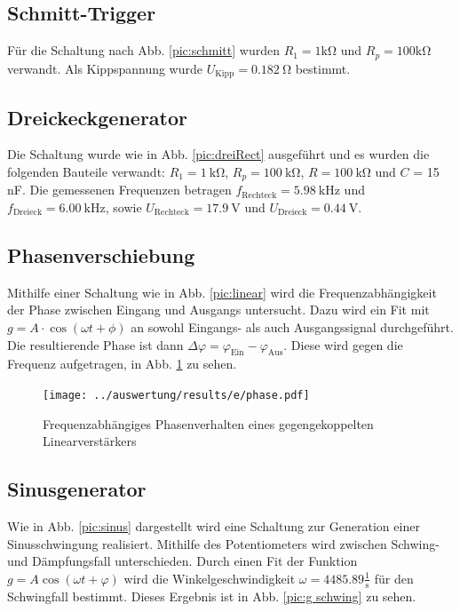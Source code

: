 \subsection{Schmitt-Trigger}
Für die Schaltung nach Abb. \ref{pic:schmitt} wurden $R_1 = 1 \si{\kilo\ohm}$ und $R_p = 100 \si{\kilo\ohm}$ verwandt. Als Kippspannung wurde $U_\text{Kipp} = 0.182\ \si{\ohm}$ bestimmt.

\subsection{Dreickeckgenerator}
Die Schaltung wurde wie in Abb. \ref{pic:dreiRect} ausgeführt und es wurden die folgenden Bauteile verwandt: $R_1 = 1\ \si{\kilo\ohm}$, $R_p = 100\ \si{\kilo\ohm}$, $R = 100\ \si{\kilo\ohm}$ und $C$ = 15 nF. Die gemessenen Frequenzen betragen $f_\text{Rechteck} = 5.98\ \si{\kilo\hertz}$ und $f_\text{Dreieck} = 6.00\ \si{\kilo\hertz}$, sowie $U_\text{Rechteck} = 17.9\ \si{\volt}$ und $U_\text{Dreieck} = 0.44\ \si{\volt}$.

\subsection{Phasenverschiebung}
Mithilfe einer Schaltung wie in Abb. \ref{pic:linear} wird die Frequenzabhängigkeit der Phase zwischen Eingang und Ausgangs untersucht. Dazu wird ein Fit mit $g = A \cdot \cos (\omega t + \phi)$ an sowohl Eingangs- als auch Ausgangssignal durchgeführt. Die resultierende Phase ist dann $\Delta \varphi = \varphi_\text{Ein} - \varphi_\text{Aus}$. Diese wird gegen die Frequenz aufgetragen, in Abb. \ref{pic:e phase} zu sehen.

\begin{figure}
	\centering
	\texttt{[image: ../auswertung/results/e/phase.pdf]}
	\caption{Frequenzabhängiges Phasenverhalten eines gegengekoppelten Linearverstärkers}
	\label{pic:e phase}
\end{figure}


\subsection{Sinusgenerator}
Wie in Abb. \ref{pic:sinus} dargestellt wird eine Schaltung zur Generation einer Sinusschwingung realisiert. Mithilfe des Potentiometers wird zwischen Schwing- und Dämpfungsfall unterschieden. Durch einen Fit der Funktion $g = A\cos(\omega t + \varphi)$ wird die Winkelgeschwindigkeit $\omega = 4485.89 \frac{1}{\si{\second}}$ für den Schwingfall bestimmt. Dieses Ergebnis ist in Abb. \ref{pic:g schwing} zu sehen.

